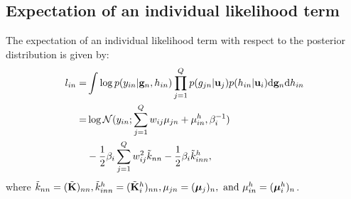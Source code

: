 \subsection{Expectation of an individual likelihood term}
The expectation of an individual likelihood term with respect to the posterior distribution is given by:
\begin{align}
\nonumber
l_{in} =& \int \log p(y_{in} | \mathbf{g}_n, h_{in}) \prod_{j=1}^Q p(g_{jn} | \mathbf{u}_j) p(h_{in} | \mathbf{u}_i) \mathrm{d} \mathbf{g}_n \mathrm{d} h_{in} \\
\nonumber
=& \log \mathcal{N}(y_{in}; \sum_{j=1}^Q w_{ij} \mu_{jn}+ \mu^h_{in}, \beta_i^{-1}) \\
&- \frac{1}{2} \beta_i \sum_{j=1}^Q w_{ij}^2 \tilde{k}_{nn} 
- \frac{1}{2} \beta_i \tilde{k}^h_{inn},
\label{eq:lin}
\end{align}
where $\tilde{k}_{nn} = (\tilde{\mathbf{K}})_{nn}, \tilde{k}^h_{inn} = (\tilde{\mathbf{K}}^h_i)_{nn}, \mu_{jn} = (\boldsymbol{\mu}_j)_n, \text{ and } \mu^h_{in} = (\boldsymbol{\mu}^h_i)_n$.


